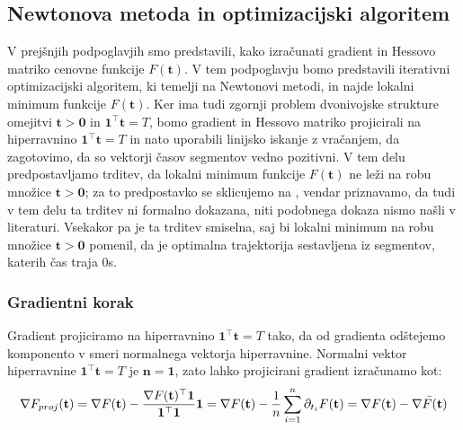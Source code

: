 \documentclass[mat2, tisk]{fmfdelo}
\newcommand{\tvec}{\mathbf{t}}
\begin{document}
\subsection{Newtonova metoda in optimizacijski algoritem}

V prejšnjih podpoglavjih smo predstavili, kako izračunati gradient in Hessovo matriko cenovne funkcije $F(\tvec)$. V tem podpoglavju bomo predstavili iterativni optimizacijski algoritem, ki temelji na Newtonovi metodi, in najde lokalni minimum funkcije $F(\tvec)$. Ker ima tudi zgornji problem dvonivojske strukture omejitvi $\mathbf{t} > \mathbf{0}$ in $\mathbf{1}^\top \mathbf{t} = T$, bomo gradient in Hessovo matriko projicirali na hiperravnino $\mathbf{1}^\top \mathbf{t} = T$ in nato uporabili linijsko iskanje z vračanjem, da zagotovimo, da so vektorji časov segmentov vedno pozitivni. V tem delu predpostavljamo trditev, da lokalni minimum funkcije $F(\tvec)$ ne leži na robu množice $\mathbf{t} > \mathbf{0}$; za to predpostavko se sklicujemo na \cite{sun2021fast}, vendar priznavamo, da tudi v tem delu ta trditev ni formalno dokazana, niti podobnega dokaza nismo našli v literaturi. Vsekakor pa je ta trditev smiselna, saj bi lokalni minimum na robu množice $\mathbf{t} > \mathbf{0}$ pomenil, da je optimalna trajektorija sestavljena iz segmentov, katerih čas traja 0s.

\subsubsection{Gradientni korak}

Gradient projiciramo na hiperravnino $\mathbf{1}^\top \mathbf{t} = T$ tako, da od gradienta odštejemo komponento v smeri normalnega vektorja hiperravnine. Normalni vektor hiperravnine $\mathbf{1}^\top \mathbf{t} = T$ je $\mathbf{n} = \mathbf{1}$, zato lahko projicirani gradient izračunamo kot:
\begin{equation}
    \nabla F_{proj}(\tvec) = \nabla F(\tvec) - \frac{\nabla F(\tvec)^\top \mathbf{1}}{\mathbf{1}^\top \mathbf{1}} \mathbf{1} = \nabla F(\tvec) - \frac{1}{n} \sum_{i=1}^n \partial_{t_i} F(\tvec) = \nabla F(\tvec) - \Bar{\nabla F(\tvec)}
\end{equation}
\end{document}
